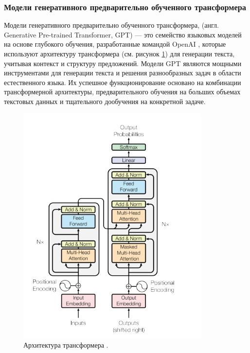 \documentclass[a4paper,12pt]{extarticle}
\begin{document}
\subsubsection{Модели генеративного предварительно обученного трансформера}

Модели генеративного предварительно обученного трансформера, (англ. Generative Pre-trained Transformer, GPT) — это семейство языковых моделей на основе глубокого обучения, разработанные командой OpenAI \cite{gpt-1}, которые используют архитектуру трансформера (см. рисунок \ref{fig:transformers_arch}) для генерации текста, учитывая контекст и структуру предложений. Модели GPT являются мощными инструментами для генерации текста и решения разнообразных задач в области естественного языка. Их успешное функционирование основано на комбинации трансформерной архитектуры, предварительного обучения на больших объемах текстовых данных и тщательного дообучения на конкретной задаче.

\begin{figure}[ht]
	\centering
	\includegraphics[scale=0.7]{transformer.png}
	\caption{Архитектура трансформера \cite{transformers}.}
	\label{fig:transformers_arch}
\end{figure}
\end{document}
